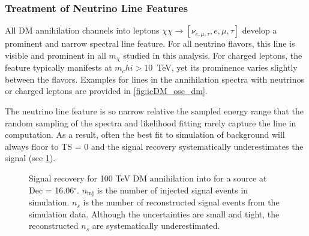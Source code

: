 \subsubsection{Treatment of Neutrino Line Features}\label{sec:icDM_nu_lines}

All DM annihilation channels into leptons $ \chi\chi \rightarrow [\nu_{e, \mu, \tau}, e, \mu,\tau] $ develop a prominent and narrow spectral line feature.
For all neutrino flavors, this line is visible and prominent in all $m_\chi$ studied in this analysis.
For charged leptons, the feature typically manifests at $m_chi > 10$~TeV, yet its prominence varies slightly between the flavors.
Examples for lines in the annihilation spectra with neutrinos or charged leptons are provided in \cref{fig:icDM_osc_dm}.



The neutrino line feature is so narrow relative the sampled energy range that the random sampling of the spectra and likelihood fitting rarely capture the line in computation.
As a result, often the best fit to simulation of background will always floor to TS = 0 and the signal recovery systematically underestimates the signal (see \cref{fig:sig_recovery_fail}).

\begin{figure}[t]
    \caption{Signal recovery for 100 TeV DM annihilation into \parpar{\nu_\mu} for a source at Dec = 16.06$^\circ$. $n_\mathrm{inj}$ is the number of injected signal events in simulation. $n_s$ is the number of reconstructed signal events from the simulation data. Although the uncertainties are small and tight, the reconstructed $ n_s $ are systematically underestimated.} \label{fig:sig_recovery_fail}
\end{figure}

